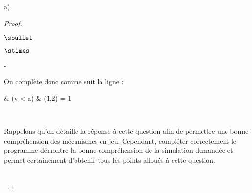 \documentclass[11pt]{article}%
\begin{document}
\begin{liste}{a)}
\begin{proof}
\begin{noliste}{$\sbullet$}
\begin{noliste}{$\stimes$}
\begin{noliste}{-}
\begin{center}
        \end{center}          
        On complète donc comme suit la ligne  :
        \begin{scilabC}{6}
          & \qquad \qquad {} (v < a)  \nl %
          & \qquad \qquad \qquad {}(1,2) = 1 \nl %
        \end{scilabC}~\\[-1cm]
      \end{noliste}
    \end{noliste}
  \end{noliste}
  \begin{remark}%
    Rappelons qu'on détaille la réponse à cette question afin de
    permettre une bonne compréhension des mécanismes en
    jeu. Cependant, compléter correctement le programme \Scilab{}
    démontre la bonne compréhension de la simulation demandée et
    permet certainement d'obtenir tous les points alloués à cette
    question.
  \end{remark}~\\[-1.2cm]
\end{proof}
\end{liste}


\newpage
\end{document}
